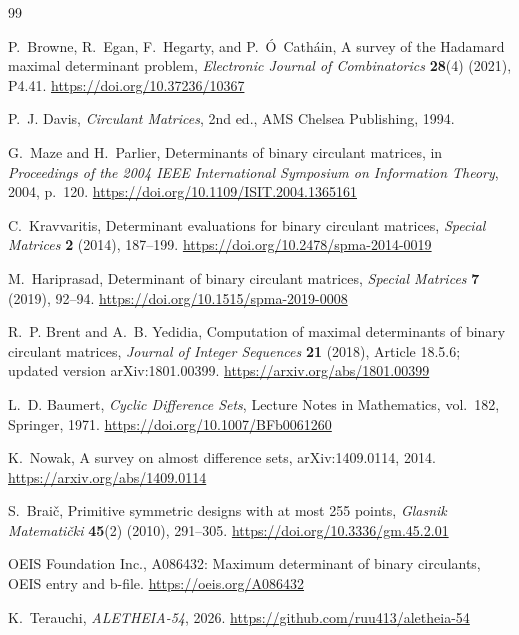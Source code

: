 \documentclass[11pt,a4paper]{article}
\theoremstyle{definition}
\theoremstyle{remark}
\begin{document}
\begin{thebibliography}{99}

P.~Browne, R.~Egan, F.~Hegarty, and P.~\'O~Cath\'ain,
\newblock A survey of the Hadamard maximal determinant problem,
\newblock \emph{Electronic Journal of Combinatorics} \textbf{28}(4) (2021),
P4.41.
\newblock \url{https://doi.org/10.37236/10367}

P.~J. Davis,
\newblock \emph{Circulant Matrices}, 2nd ed.,
\newblock AMS Chelsea Publishing, 1994.

G.~Maze and H.~Parlier,
\newblock Determinants of binary circulant matrices,
\newblock in \emph{Proceedings of the 2004 IEEE International Symposium on
Information Theory}, 2004, p.~120.
\newblock \url{https://doi.org/10.1109/ISIT.2004.1365161}

C.~Kravvaritis,
\newblock Determinant evaluations for binary circulant matrices,
\newblock \emph{Special Matrices} \textbf{2} (2014), 187--199.
\newblock \url{https://doi.org/10.2478/spma-2014-0019}

M.~Hariprasad,
\newblock Determinant of binary circulant matrices,
\newblock \emph{Special Matrices} \textbf{7} (2019), 92--94.
\newblock \url{https://doi.org/10.1515/spma-2019-0008}

R.~P. Brent and A.~B. Yedidia,
\newblock Computation of maximal determinants of binary circulant matrices,
\newblock \emph{Journal of Integer Sequences} \textbf{21} (2018), Article
18.5.6; updated version arXiv:1801.00399.
\newblock \url{https://arxiv.org/abs/1801.00399}

L.~D. Baumert,
\newblock \emph{Cyclic Difference Sets},
\newblock Lecture Notes in Mathematics, vol.~182, Springer, 1971.
\newblock \url{https://doi.org/10.1007/BFb0061260}

K.~Nowak,
\newblock A survey on almost difference sets,
\newblock arXiv:1409.0114, 2014.
\newblock \url{https://arxiv.org/abs/1409.0114}

S.~Brai{\v c},
\newblock Primitive symmetric designs with at most 255 points,
\newblock \emph{Glasnik Matemati\v{c}ki} \textbf{45}(2) (2010), 291--305.
\newblock \url{https://doi.org/10.3336/gm.45.2.01}

OEIS Foundation Inc.,
\newblock A086432: Maximum determinant of binary circulants,
\newblock OEIS entry and b-file.
\newblock \url{https://oeis.org/A086432}

K.~Terauchi,
\newblock \emph{ALETHEIA-54}, 2026.
\newblock \url{https://github.com/ruu413/aletheia-54}

\end{thebibliography}
\end{document}
